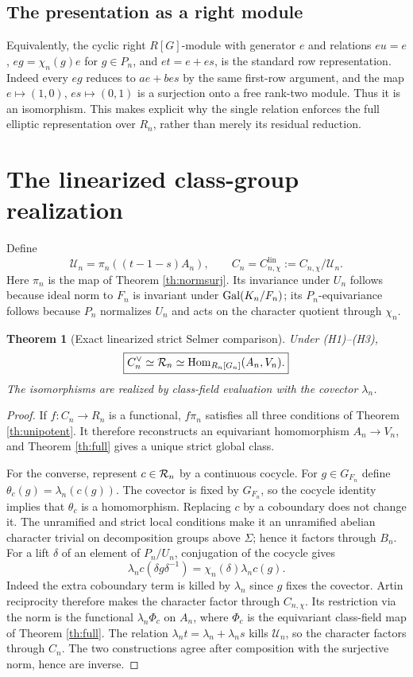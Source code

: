 \documentclass[11pt,a4paper]{article}
\newtheorem{theorem}{Theorem}[section]
\theoremstyle{definition}\newtheorem{definition}[theorem]{Definition}
\theoremstyle{remark}\newtheorem{remark}[theorem]{Remark}
\numberwithin{equation}{section}
\begin{document}
\subsection*{The presentation as a right module}
Equivalently, the cyclic right $R[G]$-module with generator $e$ and relations $eu=e$, $eg=\chi_n(g)e$ for $g\in P_n$, and $et=e+es$, is the standard row representation. Indeed every $eg$ reduces to $ae+bes$ by the same first-row argument, and the map $e\mapsto(1,0)$, $es\mapsto(0,1)$ is a surjection onto a free rank-two module. Thus it is an isomorphism. This makes explicit why the single relation enforces the full elliptic representation over $R_n$, rather than merely its residual reduction.


\section{The linearized class-group realization}
Define
\[
\mathscr U_n=\pi_n((t-1-s)A_n),\qquad
C_n=C^{\mathrm{lin}}_{n,\chi}:=C_{n,\chi}/\mathscr U_n.
\]
Here $\pi_n$ is the map of Theorem \ref{th:normsurj}. Its invariance under $U_n$ follows because ideal norm to $F_n$ is invariant under $\operatorname{Gal}(K_n/F_n)$; its $P_n$-equivariance follows because $P_n$ normalizes $U_n$ and acts on the character quotient through $\chi_n$.

\begin{theorem}[Exact linearized strict Selmer comparison]\label{th:strict}
Under (H1)--(H3),
\begin{equation}\label{eq:linearized}
\boxed{C_n^\vee\simeq\mathcal R_n\simeq\operatorname{Hom}_{R_n[G_n]}(A_n,V_n).}
\end{equation}
The isomorphisms are realized by class-field evaluation with the covector $\lambda_n$.
\end{theorem}
\begin{proof}
If $f:C_n\to R_n$ is a functional, $f\pi_n$ satisfies all three conditions of Theorem \ref{th:unipotent}. It therefore reconstructs an equivariant homomorphism $A_n\to V_n$, and Theorem \ref{th:full} gives a unique strict global class.

For the converse, represent $c\in\mathcal R_n$ by a continuous cocycle. For $g\in G_{F_n}$ define $\theta_c(g)=\lambda_n(c(g))$. The covector is fixed by $G_{F_n}$, so the cocycle identity implies that $\theta_c$ is a homomorphism. Replacing $c$ by a coboundary does not change it. The unramified and strict local conditions make it an unramified abelian character trivial on decomposition groups above $\Sigma$; hence it factors through $B_n$. For a lift $\delta$ of an element of $P_n/U_n$, conjugation of the cocycle gives
\[
\lambda_n c(\delta g\delta^{-1})=\chi_n(\delta)\lambda_n c(g).
\]
Indeed the extra coboundary term is killed by $\lambda_n$ since $g$ fixes the covector. Artin reciprocity therefore makes the character factor through $C_{n,\chi}$. Its restriction via the norm is the functional $\lambda_n\Phi_c$ on $A_n$, where $\Phi_c$ is the equivariant class-field map of Theorem \ref{th:full}. The relation $\lambda_n t=\lambda_n+\lambda_ns$ kills $\mathscr U_n$, so the character factors through $C_n$. The two constructions agree after composition with the surjective norm, hence are inverse.\end{proof}
\end{document}
